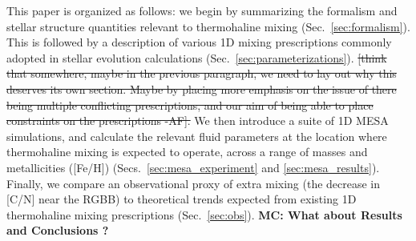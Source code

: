 This paper is organized as follows: we begin by summarizing the formalism and stellar structure quantities relevant to thermohaline mixing (Sec.~\ref{sec:formalism}). This is followed by a description of various 1D mixing prescriptions commonly adopted in stellar evolution calculations (Sec.~\ref{sec:parameterizations}). \sout{[think that somewhere, maybe in the previous paragraph, we need to lay out why this deserves its own section. Maybe by placing more emphasis on the issue of there being multiple conflicting prescriptions, and our aim of being able to place constraints on the prescriptions -AF].}
We then introduce a suite of 1D MESA simulations, and calculate the relevant fluid parameters at the location where thermohaline mixing is expected to operate, across a range of masses and metallicities ([Fe/H])  (Secs.~\ref{sec:mesa_experiment} and \ref{sec:mesa_results}). 
Finally, we compare an observational proxy of extra mixing (the decrease in [C/N] near the RGBB) to theoretical trends expected from existing 1D thermohaline mixing prescriptions (Sec.~\ref{sec:obs}). 
\textbf{MC: What about Results and Conclusions ?}
